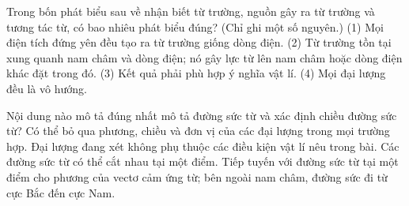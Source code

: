 \begin{ex}
Trong bốn phát biểu sau về nhận biết từ trường, nguồn gây ra từ trường và tương tác từ, có bao nhiêu phát biểu đúng? (Chỉ ghi một số nguyên.) (1) Mọi điện tích đứng yên đều tạo ra từ trường giống dòng điện. (2) Từ trường tồn tại xung quanh nam châm và dòng điện; nó gây lực từ lên nam châm hoặc dòng điện khác đặt trong đó. (3) Kết quả phải phù hợp ý nghĩa vật lí. (4) Mọi đại lượng đều là vô hướng.
\end{ex}

\begin{ex}
Nội dung nào mô tả đúng nhất mô tả đường sức từ và xác định chiều đường sức từ?
\choice
{Có thể bỏ qua phương, chiều và đơn vị của các đại lượng trong mọi trường hợp.}
{Đại lượng đang xét không phụ thuộc các điều kiện vật lí nêu trong bài.}
{Các đường sức từ có thể cắt nhau tại một điểm.}
{\True Tiếp tuyến với đường sức từ tại một điểm cho phương của vectơ cảm ứng từ; bên ngoài nam châm, đường sức đi từ cực Bắc đến cực Nam.}
\end{ex}

